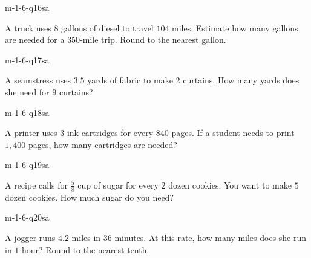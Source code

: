 
\begin{practiceQuestion}{m-1-6-q16}{sa}
\begin{questionText}
A truck uses $8$ gallons of diesel to travel $104$ miles. Estimate how many gallons are needed for a $350$-mile trip. Round to the nearest gallon.
\end{questionText}
\end{practiceQuestion}

\begin{practiceQuestion}{m-1-6-q17}{sa}
\begin{questionText}
A seamstress uses $3.5$ yards of fabric to make $2$ curtains. How many yards does she need for $9$ curtains?
\end{questionText}
\end{practiceQuestion}

\begin{practiceQuestion}{m-1-6-q18}{sa}
\begin{questionText}
A printer uses $3$ ink cartridges for every $840$ pages. If a student needs to print $1{,}400$ pages, how many cartridges are needed?
\end{questionText}
\end{practiceQuestion}

\begin{practiceQuestion}{m-1-6-q19}{sa}
\begin{questionText}
A recipe calls for $\frac{5}{8}$ cup of sugar for every $2$ dozen cookies. You want to make $5$ dozen cookies. How much sugar do you need?
\end{questionText}
\end{practiceQuestion}

\begin{practiceQuestion}{m-1-6-q20}{sa}
\begin{questionText}
A jogger runs $4.2$ miles in $36$ minutes. At this rate, how many miles does she run in $1$ hour? Round to the nearest tenth.
\end{questionText}
\end{practiceQuestion}

